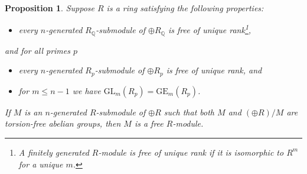 \documentclass[11pt,letterpaper]{amsart}
\newtheorem{proposition}[theorem]{Proposition}
\begin{document}
\begin{proposition}
\label{bassprop}
Suppose $R$ is a ring satisfying the following properties: 
\begin{itemize}
\item[$(\mathbb{Q})$] 
every $n$-generated $R_{\mathbb Q}$-submodule of $\oplus R_{\mathbb Q}$ is free of unique rank\footnote{A finitely generated $R$-module is free of unique rank if it is isomorphic to $R^m$ for a unique $m$.},
\end{itemize}
and for all primes $p$
\begin{itemize}
\item[$(p_0)$]
every $n$-generated $R_p$-submodule of $\oplus R_p$ is free of unique rank, and
\item[$(p_1)$] 
for $m\leqslant n-1$ we have $\mathrm{GL}_m(R_p)=\mathrm{GE}_m(R_p)$. %
\end{itemize}
If $M$ is an $n$-generated $R$-submodule of $\oplus R$ such that both $M$ and $(\oplus R)/M$ are torsion-free abelian groups, then $M$ is a free $R$-module. 
\end{proposition}
\end{document}
